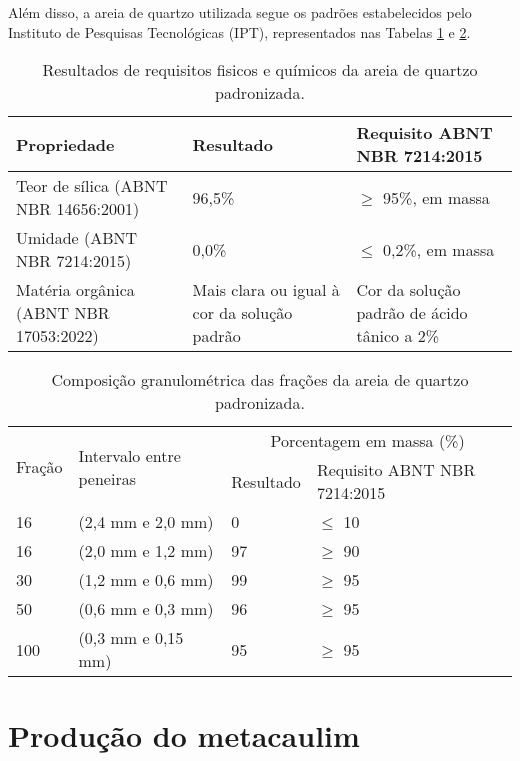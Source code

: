Além disso, a areia de quartzo utilizada segue os padrões estabelecidos pelo Instituto de Pesquisas Tecnológicas (IPT), representados nas Tabelas \ref{tab:areia_quartzo_propriedades} e \ref{tab:areia_quartzo_granulometria}.

\begin{table}[H]
    \caption{Resultados de requisitos fisicos e químicos da areia de quartzo padronizada.}
    \label{tab:areia_quartzo_propriedades}
    \center
    \begin{tabular}{p{} p{} p{}}
        \hline
        Propriedade & Resultado & Requisito ABNT NBR 7214:2015 \\
        \hline
        Teor de sílica (ABNT NBR 14656:2001) & 96,5\% & $\geq$ 95\%, em massa \\
        Umidade (ABNT NBR 7214:2015) & 0,0\% & $\leq$ 0,2\%, em massa \\
        Matéria orgânica (ABNT NBR 17053:2022) & Mais clara ou igual à cor da solução padrão & Cor da solução padrão de ácido tânico a 2\% \\
        \hline
    \end{tabular}
\end{table}

\begin{table}[H]
    \caption{Composição granulométrica das frações da areia de quartzo padronizada.}
    \label{tab:areia_quartzo_granulometria}
    \centering
    \begin{tabular}{p{} p{} p{} p{}}
        \hline
        \multirow{2}{=}{Fração} & \multirow{2}{=}{Intervalo entre peneiras} & \multicolumn{2}{c}{Porcentagem em massa (\%)} \\ \cline{3-4}       
        & & Resultado & Requisito ABNT NBR 7214:2015 \\
        \hline
        16 & (2,4 mm e 2,0 mm) & 0 & $\leq$ 10 \\
        16 & (2,0 mm e 1,2 mm) & 97 & $\geq$ 90 \\
        30 & (1,2 mm e 0,6 mm) & 99 & $\geq$ 95 \\
        50 & (0,6 mm e 0,3 mm) & 96 & $\geq$ 95 \\
        100 & (0,3 mm e 0,15 mm) & 95 & $\geq$ 95 \\
        \hline
    \end{tabular}
\end{table}

\section{Produção do metacaulim}
\label{sec:producao_do_metacaulim}

